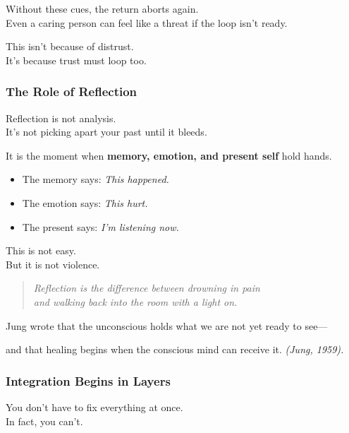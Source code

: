 Without these cues, the return aborts again.\\
Even a caring person can feel like a threat if the loop isn't ready.

This isn't because of distrust.\\
It's because trust must loop too.

\subsubsection{\texorpdfstring{\textbf{The Role of
Reflection}}{The Role of Reflection}}\label{the-role-of-reflection}

Reflection is not analysis.\\
It's not picking apart your past until it bleeds.

It is the moment when \textbf{memory, emotion, and present self} hold
hands.

\begin{itemize}
\item
  The memory says: \emph{This happened.\\
  }
\item
  The emotion says: \emph{This hurt.\\
  }
\item
  The present says: \emph{I'm listening now.\\
  }
\end{itemize}

This is not easy.\\
But it is not violence.

\begin{quote}
\emph{Reflection is the difference between drowning in pain\\
and walking back into the room with a light on.}
\end{quote}

Jung wrote that the unconscious holds what we are not yet ready to
see---

and that healing begins when the conscious mind can receive it.
\emph{(Jung, 1959).}

\subsubsection{\texorpdfstring{\textbf{Integration Begins in
Layers}}{Integration Begins in Layers}}\label{integration-begins-in-layers}

You don't have to fix everything at once.\\
In fact, you can't.

